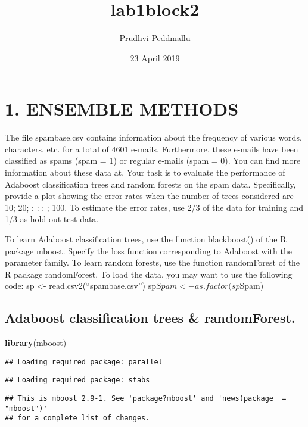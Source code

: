 \documentclass[]{article}
\title{lab1block2}
\author{Prudhvi Peddmallu}
\date{23 April 2019}
\newenvironment{Shaded}{\begin{snugshade}}{\end{snugshade}}
\newcommand{\KeywordTok}[1]{\textcolor[rgb]{0.13,0.29,0.53}{\textbf{#1}}}
\newcommand{\NormalTok}[1]{#1}
\begin{document}
\maketitle

\section{1. ENSEMBLE METHODS}\label{ensemble-methods}

The file spambase.csv contains information about the frequency of
various words, characters, etc. for a total of 4601 e-mails.
Furthermore, these e-mails have been classified as spams (spam = 1) or
regular e-mails (spam = 0). You can find more information about these
data at. Your task is to evaluate the performance of Adaboost
classification trees and random forests on the spam data. Specifically,
provide a plot showing the error rates when the number of trees
considered are 10; 20; : : : ; 100. To estimate the error rates, use 2/3
of the data for training and 1/3 as hold-out test data.

To learn Adaboost classification trees, use the function blackboost() of
the R package mboost. Specify the loss function corresponding to
Adaboost with the parameter family. To learn random forests, use the
function randomForest of the R package randomForest. To load the data,
you may want to use the following code: sp \textless{}-
read.csv2(``spambase.csv'') sp\(Spam <- as.factor(sp\)Spam)

\subsection{Adaboost classification trees \&
randomForest.}\label{adaboost-classification-trees-randomforest.}

\begin{Shaded}
\begin{Highlighting}[]
\KeywordTok{library}\NormalTok{(mboost)}
\end{Highlighting}
\end{Shaded}

\begin{verbatim}
## Loading required package: parallel
\end{verbatim}

\begin{verbatim}
## Loading required package: stabs
\end{verbatim}

\begin{verbatim}
## This is mboost 2.9-1. See 'package?mboost' and 'news(package  = "mboost")'
## for a complete list of changes.
\end{verbatim}
\end{document}
